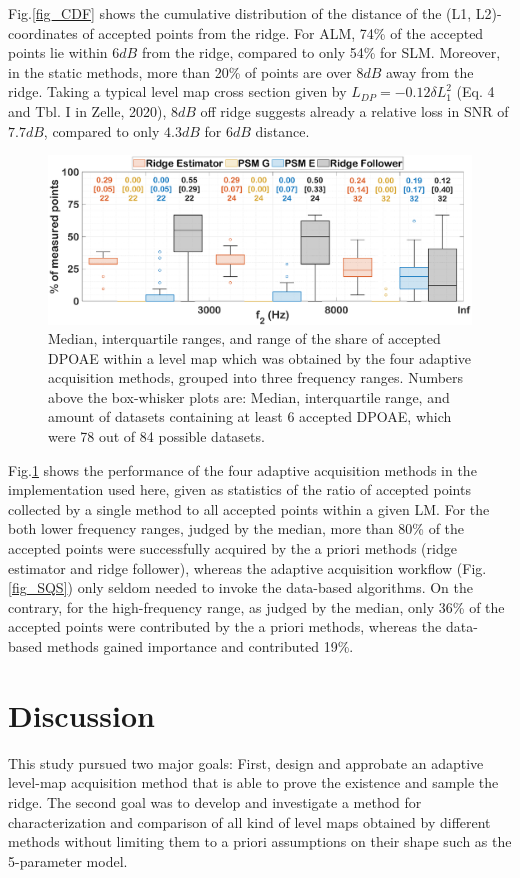 \documentclass[journal,twoside,web]{ieeecolor2}
\begin{document}
Fig.\ref{fig_CDF} shows the cumulative distribution of the distance of the (L1, L2)-coordinates of accepted points from the ridge.
For ALM, 74\% of the accepted points lie within $6 dB$ from the ridge, compared to only 54\% for SLM.
Moreover, in the static methods, more than 20\% of points are over $8 dB$ away from the ridge.
Taking a typical level map cross section given by $L_{DP} =-0.12 \delta L_1^2$ (Eq.
4 and Tbl.
I in Zelle, 2020), $8 dB$ off ridge suggests already a relative loss in SNR of $7.7 dB$, compared to only $4.3 dB$ for $6 dB$ distance.

\begin{figure}[ht]
\centerline{\includegraphics[width=\columnwidth]{Fig_10_Boxplots.eps}}
\caption{Median, interquartile ranges, and range of the share of accepted DPOAE within a level map which was obtained by the four adaptive acquisition methods, grouped into three frequency ranges.
Numbers above the box-whisker plots are: Median, interquartile range, and amount of datasets containing at least 6 accepted DPOAE, which were 78 out of 84 possible datasets.}
\label{fig_BXP}
\end{figure}

Fig.\ref{fig_BXP} shows the performance of the four adaptive acquisition methods in the implementation used here, given as statistics of the ratio of accepted points collected by a single method to all accepted points within a given LM.
For the both lower frequency ranges, judged by the median, more than 80\% of the accepted points were successfully acquired by the a priori methods (ridge estimator and ridge follower), whereas the adaptive acquisition workflow (Fig.\ref{fig_SQS}) only seldom needed to invoke the data-based algorithms.
On the contrary, for the high-frequency range, as judged by the median, only 36\% of the accepted points were contributed by the a priori methods, whereas the data-based methods gained importance and contributed 19\%.

\section{Discussion}
This study pursued two major goals: First, design and approbate an adaptive level-map acquisition method that is able to prove the existence and sample the ridge.
The second goal was to develop and investigate a method for characterization and comparison of all kind of level maps obtained by different methods without limiting them to a priori assumptions on their shape such as the 5-parameter model.
\end{document}
